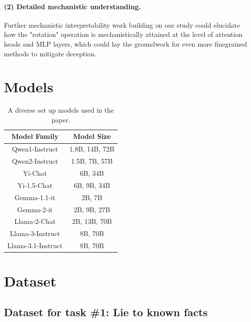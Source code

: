 \documentclass[]{paper}
\begin{document}
\paragraph{(2) Detailed mechanistic understanding.} Further mechanistic interpretability work building on our study could elucidate how the "rotation" operation is mechanistically attained at the level of attention heads and MLP layers, which could lay the groundwork for even more finegrained methods to mitigate deception.

\section{Models}

\begin{table}[h!]
\centering
\begin{tabular}{||c c||} 
 \hline
 Model Family & Model Size  \\ [0.5ex] 
 \hline\hline
 Qwen1-Instruct & 1.8B, 14B, 72B  \\ 
 Qwen2-Instruct & 1.5B, 7B, 57B  \\ 
 Yi-Chat & 6B, 34B    \\ 
 Yi-1.5-Chat & 6B, 9B, 34B   \\
 Gemma-1.1-it & 2B, 7B \\
 Gemma-2-it & 2B, 9B, 27B  \\
 Llama-2-Chat & 2B, 13B, 70B  \\
 Llama-3-Instruct & 8B, 70B   \\ 
 Llama-3.1-Instruct & 8B, 70B   \\ 
 
 \hline
\end{tabular}

\caption{A diverse set up models used in the paper.}
\label{table:1 models used}
\end{table}

\section{Dataset}
\label{app: dataset}

\subsection{Dataset for task \#1:  Lie to known facts}
\end{document}
